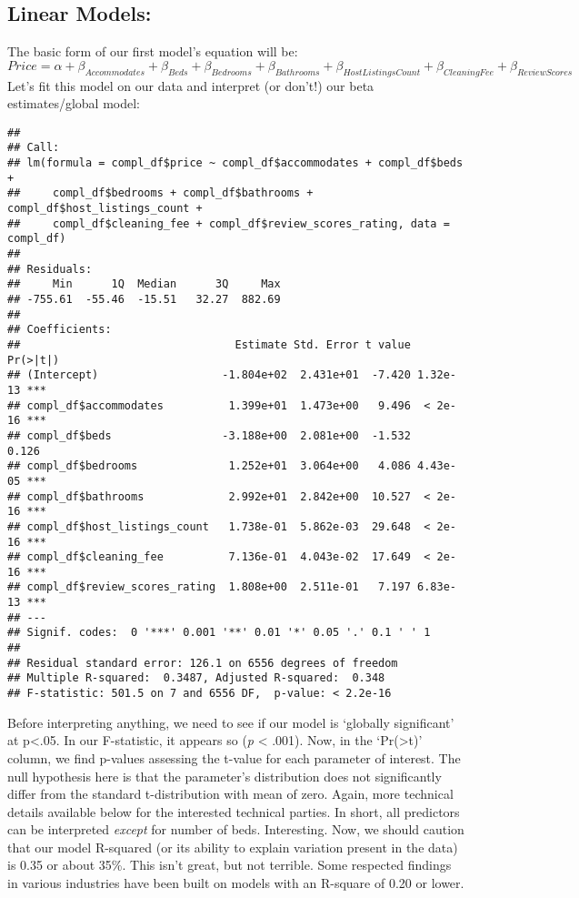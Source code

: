 \documentclass[]{article}
\begin{document}
\hypertarget{linear-models}{%
\subsection{Linear Models:}\label{linear-models}}

The basic form of our first model's equation will be:
\[Price = \alpha + \beta_{Accommodates} + \beta_{Beds} + \beta_{Bedrooms} + \beta_{Bathrooms} + \beta_{Host Listings Count} + \beta_{Cleaning Fee} + \beta_{Review Scores}\]
Let's fit this model on our data and interpret (or don't!) our beta
estimates/global model:

\begin{verbatim}
## 
## Call:
## lm(formula = compl_df$price ~ compl_df$accommodates + compl_df$beds + 
##     compl_df$bedrooms + compl_df$bathrooms + compl_df$host_listings_count + 
##     compl_df$cleaning_fee + compl_df$review_scores_rating, data = compl_df)
## 
## Residuals:
##     Min      1Q  Median      3Q     Max 
## -755.61  -55.46  -15.51   32.27  882.69 
## 
## Coefficients:
##                                 Estimate Std. Error t value Pr(>|t|)    
## (Intercept)                   -1.804e+02  2.431e+01  -7.420 1.32e-13 ***
## compl_df$accommodates          1.399e+01  1.473e+00   9.496  < 2e-16 ***
## compl_df$beds                 -3.188e+00  2.081e+00  -1.532    0.126    
## compl_df$bedrooms              1.252e+01  3.064e+00   4.086 4.43e-05 ***
## compl_df$bathrooms             2.992e+01  2.842e+00  10.527  < 2e-16 ***
## compl_df$host_listings_count   1.738e-01  5.862e-03  29.648  < 2e-16 ***
## compl_df$cleaning_fee          7.136e-01  4.043e-02  17.649  < 2e-16 ***
## compl_df$review_scores_rating  1.808e+00  2.511e-01   7.197 6.83e-13 ***
## ---
## Signif. codes:  0 '***' 0.001 '**' 0.01 '*' 0.05 '.' 0.1 ' ' 1
## 
## Residual standard error: 126.1 on 6556 degrees of freedom
## Multiple R-squared:  0.3487, Adjusted R-squared:  0.348 
## F-statistic: 501.5 on 7 and 6556 DF,  p-value: < 2.2e-16
\end{verbatim}

Before interpreting anything, we need to see if our model is `globally
significant' at p\textless{}.05. In our F-statistic, it appears so
(\emph{p} \textless{} .001). Now, in the
`Pr(\textgreater{}\textbar{}t\textbar{})' column, we find p-values
assessing the t-value for each parameter of interest. The null
hypothesis here is that the parameter's distribution does not
significantly differ from the standard t-distribution with mean of zero.
Again, more technical details available below for the interested
technical parties. In short, all predictors can be interpreted
\emph{except} for number of beds. Interesting. Now, we should caution
that our model R-squared (or its ability to explain variation present in
the data) is 0.35 or about 35\%. This isn't great, but not terrible.
Some respected findings in various industries have been built on models
with an R-square of 0.20 or lower.
\end{document}
